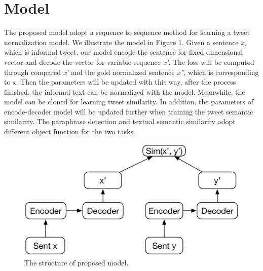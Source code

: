 \documentclass[letterpaper]{article}
\begin{document}
\section{Model}
The proposed model adopt a sequence to sequence method for learning a tweet normalization model. We illustrate the model in Figure 1. Given a sentence \textit{x}, which is informal tweet, our model encode the sentence for fixed dimensional vector and decode the vector for variable sequence \textit{x'}. The loss will be computed through compared \textit{x'} and the gold normalized sentence \textit{x''}, which is corresponding to \textit{x}. Then the parameters will be updated with this way, after the process finished, the informal text can be normalized with the model. Meanwhile, the model can be cloned for learning tweet similarity. In addition, the parameters of encode-decoder model will be updated further when training the tweet semantic similarity. The paraphrase detection and textual semantic similarity adopt different object function for the two tasks.
\begin{figure}
\centering
\includegraphics[width=1\linewidth]{models}
\caption{The structure of proposed model.}
\label{fig:model}
\end{figure}
\end{document}
